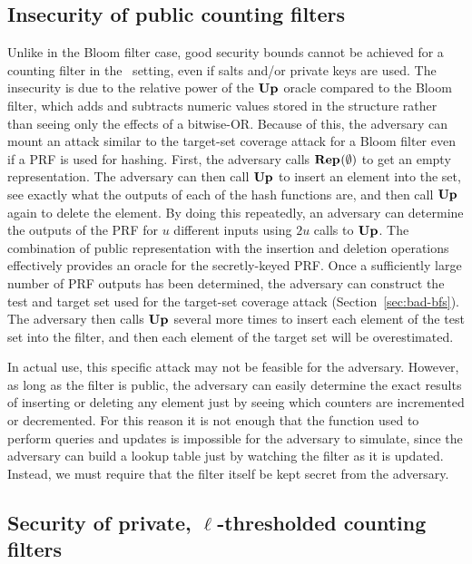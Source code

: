 \subsection{Insecurity of public counting filters}\label{sec:pub-count-bad}
Unlike in the Bloom filter case, good security bounds cannot be achieved for a
counting filter in the \errep\ setting, even if salts and/or private keys are
used. The insecurity is due to the relative power of the $\textup{\textbf{Up}}\hspace{0.5pt}$ oracle compared
to the Bloom filter, which adds and subtracts numeric values stored in the structure rather
than seeing only the effects of a bitwise-OR.
Because of this, the adversary can mount
an attack similar to the target-set coverage attack for a Bloom filter even if a
PRF is used for
hashing. First, the adversary calls $\textup{\textbf{Rep}}\hspace{0.5pt}(\emptyset)$ to get an empty
representation. The adversary can then call $\textup{\textbf{Up}}\hspace{0.5pt}$ to insert an element into the
set, see exactly what the outputs of each of the hash functions are, and then
call $\textup{\textbf{Up}}\hspace{0.5pt}$ again to delete the element. By doing this repeatedly, an adversary
can determine the outputs of the PRF for $u$ different inputs using $2u$ calls
to $\textup{\textbf{Up}}\hspace{0.5pt}$. The combination of public representation with the insertion
and deletion operations effectively provides an oracle for the secretly-keyed
PRF. Once a sufficiently large number of PRF outputs has been determined,
the adversary can construct the test and target set used for the target-set
coverage attack (Section~\ref{sec:bad-bfs}). The adversary then calls $\textup{\textbf{Up}}\hspace{0.5pt}$ several more times to insert
each element of the test set into the filter, and then
each element of the target set will be overestimated.

In actual use, this specific attack may not be feasible for the adversary.
However, as long as the filter is public, the adversary can easily determine the
exact results of inserting or deleting any element just by seeing which counters
are incremented or decremented. For this reason it is not enough that the
function used to perform queries and updates is impossible for the adversary to
simulate, since the adversary can build a lookup table just by watching the
filter as it is updated. Instead, we must require that the filter itself be kept
secret from the adversary.

\subsection{Security of private, $\ell$-thresholded counting filters}

